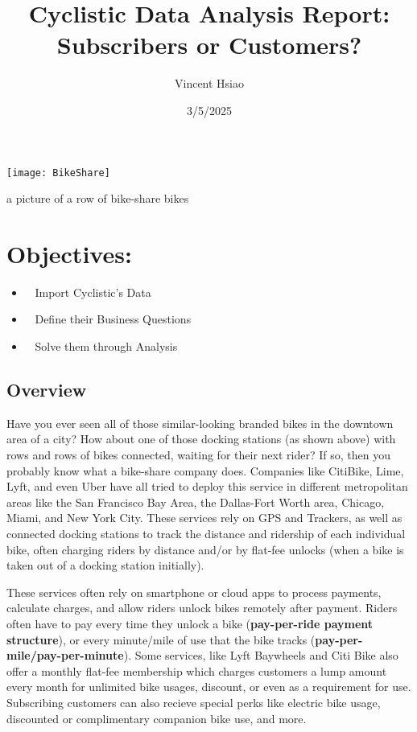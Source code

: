 \documentclass[
]{article}
\title{Cyclistic Data Analysis Report: Subscribers or Customers?}
\author{Vincent Hsiao}
\date{3/5/2025}
\begin{document}
\maketitle

\texttt{[image: BikeShare]}

a picture of a row of bike-share bikes

\section{Objectives:}\label{objectives}

\begin{itemize}
\item ~
  Import Cyclistic's Data
\item ~
  Define their Business Questions
\item ~
  Solve them through Analysis
\end{itemize}

\subsection{Overview}\label{overview}

Have you ever seen all of those similar-looking branded bikes in the
downtown area of a city? How about one of those docking stations (as
shown above) with rows and rows of bikes connected, waiting for their
next rider? If so, then you probably know what a bike-share company
does. Companies like CitiBike, Lime, Lyft, and even Uber have all tried
to deploy this service in different metropolitan areas like the San
Francisco Bay Area, the Dallas-Fort Worth area, Chicago, Miami, and New
York City. These services rely on GPS and Trackers, as well as connected
docking stations to track the distance and ridership of each individual
bike, often charging riders by distance and/or by flat-fee unlocks (when
a bike is taken out of a docking station initially).

These services often rely on smartphone or cloud apps to process
payments, calculate charges, and allow riders unlock bikes remotely
after payment. Riders often have to pay every time they unlock a bike
(\textbf{pay-per-ride payment structure}), or every minute/mile of use
that the bike tracks (\textbf{pay-per-mile/pay-per-minute}). Some
services, like Lyft Baywheels and Citi Bike also offer a monthly
flat-fee membership which charges customers a lump amount every month
for unlimited bike usages, discount, or even as a requirement for use.
Subscribing customers can also recieve special perks like electric bike
usage, discounted or complimentary companion bike use, and more.
\end{document}

